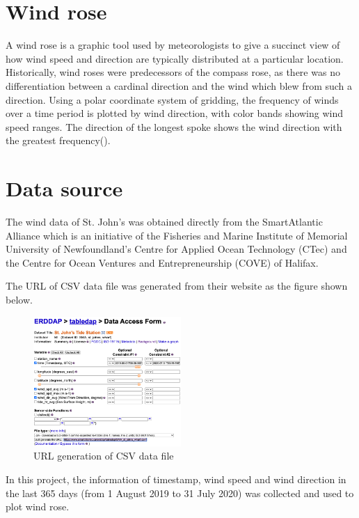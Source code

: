 
\section{Wind rose}

A wind rose is a graphic tool used by meteorologists to give a succinct view of how wind speed and direction are typically distributed at a particular location. Historically, wind roses were predecessors of the compass rose, as there was no differentiation between a cardinal direction and the wind which blew from such a direction. Using a polar coordinate system of gridding, the frequency of winds over a time period is plotted by wind direction, with color bands showing wind speed ranges. The direction of the longest spoke shows the wind direction with the greatest frequency(\cite{wikipedia}). \par


\section{Data source}
The wind data of St. John's was obtained directly from the SmartAtlantic Alliance which is an initiative of the Fisheries and Marine Institute of Memorial University of Newfoundland's Centre for Applied Ocean Technology (CTec) and the Centre for Ocean Ventures and Entrepreneurship (COVE) of Halifax.\par
The URL of CSV data file was generated from their website as the figure shown below.\par

\begin{figure}[h!]
    \centering
    \includegraphics[width=0.50\textwidth]{images/data_source.png}
    \caption{URL generation of CSV data file}
    \label{fig: PaleBlueDot}    
\end{figure}

In this project, the information of timestamp, wind speed and wind direction in the last 365 days (from 1 August 2019 to 31 July 2020) was collected and used to plot wind rose.\par

